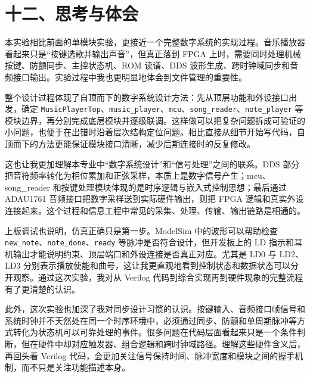 \documentclass{ctexart}
\begin{document}
\section*{十二、思考与体会}

本实验相比前面的单模块实验，更接近一个完整数字系统的实现过程。音乐播放器看起来只是``按键选歌并输出声音''，但真正落到 FPGA 上时，需要同时处理机械按键、防颤同步、主控状态机、ROM 读谱、DDS 波形生成、跨时钟域同步和音频接口输出。实验过程中我也更明显地体会到文件管理的重要性。

整个设计过程体现了自顶而下的数字系统设计方法：先从顶层功能和外设接口出发，确定 \texttt{MusicPlayerTop}、\texttt{music\_player}、\texttt{mcu}、\texttt{song\_reader}、\texttt{note\_player} 等模块边界，再分别完成底层模块并逐级联调。这样做可以把复杂问题拆成可验证的小问题，也便于在出错时沿着层次结构定位问题。相比直接从细节开始写代码，自顶而下的方法更能保证模块接口清晰，减少后期连接时的反复修改。

这也让我更加理解本专业中``数字系统设计''和``信号处理''之间的联系。DDS 部分把音符频率转化为相位累加和正弦采样，本质上是数字信号产生；mcu、song\_reader 和按键处理模块体现的是时序逻辑与嵌入式控制思想；最后通过 ADAU1761 音频接口把数字采样送到实际硬件输出，则把 FPGA 逻辑和真实外设连接起来。这个过程和信息工程中常见的采集、处理、传输、输出链路是相通的。

上板调试也说明，仿真正确只是第一步。ModelSim 中的波形可以帮助检查 \texttt{new\_note}、\texttt{note\_done}、\texttt{ready} 等脉冲是否符合设计，但开发板上的 LD 指示和耳机输出才能说明约束、顶层端口和外设连接是否真正对应。尤其是 LD0 与 LD2、LD3 分别表示播放使能和曲号，这让我更直观地看到控制状态和数据状态可以分开观察。通过这次实验，我对从 Verilog 代码到综合实现再到硬件现象的完整流程有了更清楚的认识。

此外，这次实验也加深了我对同步设计习惯的认识。按键输入、音频接口帧信号和系统时钟并不天然处在同一个时序环境中，必须通过同步、防颤和单周期脉冲等方式转化为状态机可以可靠处理的事件。很多问题在代码层面看起来只是一个条件判断，但在硬件中却对应触发器、组合逻辑和跨时钟域路径。理解这些硬件含义后，再回头看 Verilog 代码，会更加关注信号保持时间、脉冲宽度和模块之间的握手机制，而不只是关注功能描述本身。
\end{document}
